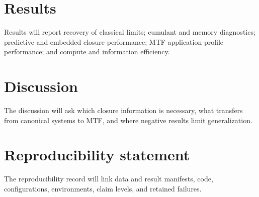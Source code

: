 \documentclass[11pt]{article}
\begin{document}
\section{Results}
Results will report recovery of classical limits; cumulant and memory
diagnostics; predictive and embedded closure performance; MTF
application-profile performance; and compute and information efficiency.

\section{Discussion}
The discussion will ask which closure information is necessary, what transfers
from canonical systems to MTF, and where negative results limit
generalization.

\section{Reproducibility statement}
The reproducibility record will link data and result manifests, code,
configurations, environments, claim levels, and retained failures.
\end{document}
